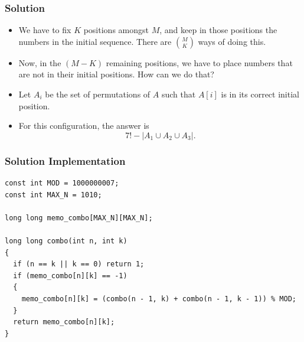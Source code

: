 \documentclass{beamer}
\begin{document}
\begin{frame}%
\frametitle{Solution}


\scriptsize

\begin{itemize}

\item We have to fix $K$ positions amongst $M$, and keep in those positions the numbers in the initial sequence.
There are $M \choose K$ ways of doing this.

\item<2-> Now, in the $(M - K)$ remaining positions, we have to place numbers that are not in their initial positions. How can we do that?


\item<11-> Let $A_i$ be the set of permutations of $A$ such that $A[i]$ is in its correct initial position.

\item<12-> For this configuration, the answer is
$$
7! - |A_1 \cup A_2 \cup A_3|.
$$

\end{itemize}

\end{frame}

\begin{frame}[containsverbatim]
\frametitle{Solution Implementation}
\scriptsize

\begin{lstlisting}
const int MOD = 1000000007;
const int MAX_N = 1010;

long long memo_combo[MAX_N][MAX_N];

long long combo(int n, int k)
{
  if (n == k || k == 0) return 1;
  if (memo_combo[n][k] == -1)
  {
    memo_combo[n][k] = (combo(n - 1, k) + combo(n - 1, k - 1)) % MOD;
  }
  return memo_combo[n][k];
}
\end{lstlisting}

\end{frame}
\end{document}
